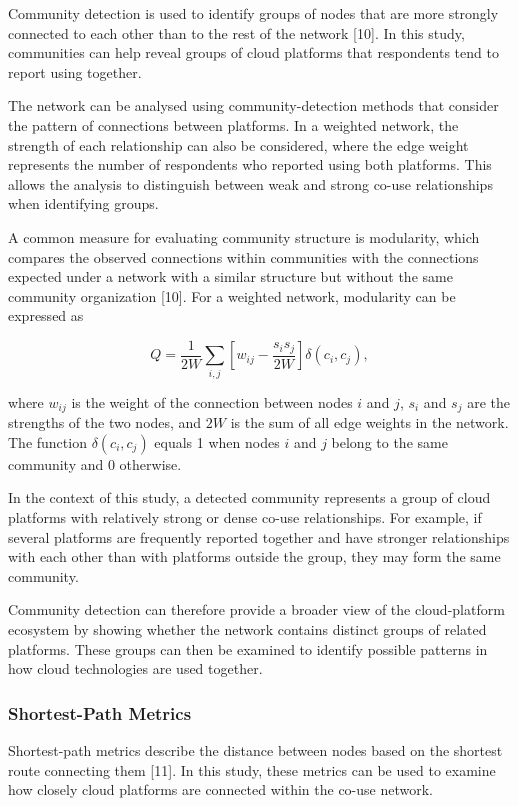 \documentclass{article}
\begin{document}
\begin{itemize}
{{{Community detection is used to identify groups of nodes that are more strongly connected to each other than to the rest of the network [10]. In this study, communities can help reveal groups of cloud platforms that respondents tend to report using together.

The network can be analysed using community-detection methods that consider the pattern of connections between platforms. In a weighted network, the strength of each relationship can also be considered, where the edge weight represents the number of respondents who reported using both platforms. This allows the analysis to distinguish between weak and strong co-use relationships when identifying groups.

A common measure for evaluating community structure is modularity, which compares the observed connections within communities with the connections expected under a network with a similar structure but without the same community organization [10]. For a weighted network, modularity can be expressed as

\[
Q =
\frac{1}{2W}
\sum_{i,j}
\left[
w_{ij}
-
\frac{s_i s_j}{2W}
\right]
\delta(c_i,c_j),
\]

where $w_{ij}$ is the weight of the connection between nodes $i$ and $j$, $s_i$ and $s_j$ are the strengths of the two nodes, and $2W$ is the sum of all edge weights in the network. The function $\delta(c_i,c_j)$ equals 1 when nodes $i$ and $j$ belong to the same community and 0 otherwise.

In the context of this study, a detected community represents a group of cloud platforms with relatively strong or dense co-use relationships. For example, if several platforms are frequently reported together and have stronger relationships with each other than with platforms outside the group, they may form the same community.

Community detection can therefore provide a broader view of the cloud-platform ecosystem by showing whether the network contains distinct groups of related platforms. These groups can then be examined to identify possible patterns in how cloud technologies are used together.
\subsubsection{Shortest-Path Metrics}

Shortest-path metrics describe the distance between nodes based on the shortest route connecting them [11]. In this study, these metrics can be used to examine how closely cloud platforms are connected within the co-use network.

}}}
\end{itemize}
\end{document}
